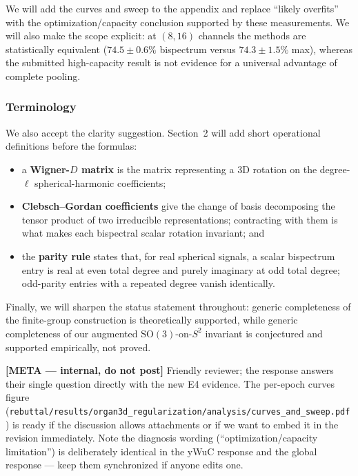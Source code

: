 \documentclass[10pt]{article}
\newenvironment{metacomment}%
  {\par\medskip\noindent\begingroup%
   \setlength{\fboxsep}{8pt}%
   \noindent\begin{lrbox}{\metabox}\begin{minipage}{\dimexpr\linewidth-2\fboxsep\relax}%
   \small\sffamily\color{metablue}%
   \textbf{[META --- internal, do not post]}\quad}%
  {\end{minipage}\end{lrbox}%
   \noindent\colorbox{metabg}{\usebox{\metabox}}\endgroup\par\medskip}
\begin{document}
We will add the curves and sweep to the appendix and replace ``likely
overfits'' with the optimization/capacity conclusion supported by these
measurements. We will also make the scope explicit: at $(8,16)$ channels the
methods are statistically equivalent ($74.5\pm0.6\%$ bispectrum versus
$74.3\pm1.5\%$ max), whereas the submitted high-capacity result is not
evidence for a universal advantage of complete pooling.

\subsubsection*{Terminology}

We also accept the clarity suggestion. Section~2 will add short operational
definitions before the formulas:

\begin{itemize}
\item a \textbf{Wigner-$D$ matrix} is the matrix representing a 3D rotation
  on the degree-$\ell$ spherical-harmonic coefficients;
\item \textbf{Clebsch--Gordan coefficients} give the change of basis
  decomposing the tensor product of two irreducible representations;
  contracting with them is what makes each bispectral scalar rotation
  invariant; and
\item the \textbf{parity rule} states that, for real spherical signals, a
  scalar bispectrum entry is real at even total degree and purely imaginary
  at odd total degree; odd-parity entries with a repeated degree vanish
  identically.
\end{itemize}

Finally, we will sharpen the status statement throughout: generic completeness
of the finite-group construction is theoretically supported, while generic
completeness of our augmented $\mathrm{SO}(3)$-on-$S^2$ invariant is
conjectured and supported empirically, not proved.

\begin{metacomment}
Friendly reviewer; the response answers their single question directly with
the new E4 evidence. The per-epoch curves figure
(\texttt{rebuttal/results/organ3d\_regularization/analysis/curves\_and\_sweep.pdf})
is ready if the discussion allows attachments or if we want to embed it in
the revision immediately. Note the diagnosis wording (``optimization/capacity
limitation'') is deliberately identical in the yWuC response and the global
response --- keep them synchronized if anyone edits one.
\end{metacomment}
\end{document}
